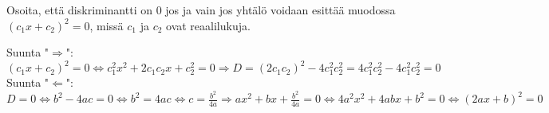 \begin{tehtavasivu}
\begin{tehtava}
	Osoita, että diskriminantti on $0$ jos ja vain jos yhtälö voidaan esittää muodossa $(c_1 x+ c_2)^2=0$, missä $c_1$ ja $c_2$ ovat reaalilukuja.
	\begin{vastaus}
		Suunta "$\Rightarrow$": $(c_1 x+ c_2)^2=0 \Leftrightarrow c_1^2 x^2 + 2c_1 c_2 x+ c_2^2 =0 \Rightarrow
		D=(2 c_1 c_2)^2-4 c_1^2 c_2^2 =4 c_1^2 c_2^2 -4 c_1^2 c_2^2 =0$ \\
		Suunta "$\Leftarrow$": $D=0 \Leftrightarrow b^2-4ac=0 \Leftrightarrow b^2=4ac \Leftrightarrow c=\frac{b^2}{4a} \Rightarrow ax^2+bx+\frac{b^2}{4a}=0 \Leftrightarrow 4a^2x^2+4abx+b^2=0 \Leftrightarrow (2ax+b)^2=0$
	\end{vastaus}
\end{tehtava}

\end{tehtavasivu}
